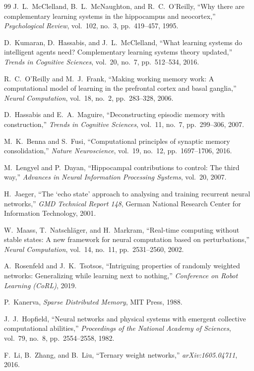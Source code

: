 \documentclass[11pt,letterpaper]{article}
\begin{document}
\begin{thebibliography}{99}
J.~L.~McClelland, B.~L.~McNaughton, and R.~C.~O'Reilly, ``Why there are complementary learning systems in the hippocampus and neocortex,'' \textit{Psychological Review}, vol.~102, no.~3, pp.~419--457, 1995.

D.~Kumaran, D.~Hassabis, and J.~L.~McClelland, ``What learning systems do intelligent agents need? Complementary learning systems theory updated,'' \textit{Trends in Cognitive Sciences}, vol.~20, no.~7, pp.~512--534, 2016.

R.~C.~O'Reilly and M.~J.~Frank, ``Making working memory work: A computational model of learning in the prefrontal cortex and basal ganglia,'' \textit{Neural Computation}, vol.~18, no.~2, pp.~283--328, 2006.

D.~Hassabis and E.~A.~Maguire, ``Deconstructing episodic memory with construction,'' \textit{Trends in Cognitive Sciences}, vol.~11, no.~7, pp.~299--306, 2007.

M.~K.~Benna and S.~Fusi, ``Computational principles of synaptic memory consolidation,'' \textit{Nature Neuroscience}, vol.~19, no.~12, pp.~1697--1706, 2016.

M.~Lengyel and P.~Dayan, ``Hippocampal contributions to control: The third way,'' \textit{Advances in Neural Information Processing Systems}, vol.~20, 2007.

H.~Jaeger, ``The `echo state' approach to analysing and training recurrent neural networks,'' \textit{GMD Technical Report 148}, German National Research Center for Information Technology, 2001.

W.~Maass, T.~Natschl\"{a}ger, and H.~Markram, ``Real-time computing without stable states: A new framework for neural computation based on perturbations,'' \textit{Neural Computation}, vol.~14, no.~11, pp.~2531--2560, 2002.

A.~Rosenfeld and J.~K.~Tsotsos, ``Intriguing properties of randomly weighted networks: Generalizing while learning next to nothing,'' \textit{Conference on Robot Learning (CoRL)}, 2019.

P.~Kanerva, \textit{Sparse Distributed Memory}, MIT Press, 1988.

J.~J.~Hopfield, ``Neural networks and physical systems with emergent collective computational abilities,'' \textit{Proceedings of the National Academy of Sciences}, vol.~79, no.~8, pp.~2554--2558, 1982.

F.~Li, B.~Zhang, and B.~Liu, ``Ternary weight networks,'' \textit{arXiv:1605.04711}, 2016.
\end{thebibliography}
\end{document}

